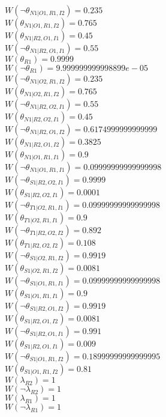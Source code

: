 $W(\neg\theta_{N1|O1,R1,I2})=0.235$\\
$W(\theta_{N1|O1,R1,I2})=0.765$\\
$W(\theta_{N1|R2,O1,I1})=0.45$\\
$W(\neg\theta_{N1|R2,O1,I1})=0.55$\\
$W(\theta_{R1})=0.9999$\\
$W(\neg\theta_{R1})=9.999999999998899e-05$\\
$W(\neg\theta_{N1|O2,R1,I2})=0.235$\\
$W(\theta_{N1|O2,R1,I2})=0.765$\\
$W(\neg\theta_{N1|R2,O2,I1})=0.55$\\
$W(\theta_{N1|R2,O2,I1})=0.45$\\
$W(\neg\theta_{N1|R2,O1,I2})=0.6174999999999999$\\
$W(\theta_{N1|R2,O1,I2})=0.3825$\\
$W(\theta_{N1|O1,R1,I1})=0.9$\\
$W(\neg\theta_{N1|O1,R1,I1})=0.09999999999999998$\\
$W(\neg\theta_{S1|R2,O2,I1})=0.9999$\\
$W(\theta_{S1|R2,O2,I1})=0.0001$\\
$W(\neg\theta_{T1|O2,R1,I1})=0.09999999999999998$\\
$W(\theta_{T1|O2,R1,I1})=0.9$\\
$W(\neg\theta_{T1|R2,O2,I2})=0.892$\\
$W(\theta_{T1|R2,O2,I2})=0.108$\\
$W(\neg\theta_{S1|O2,R1,I2})=0.9919$\\
$W(\theta_{S1|O2,R1,I2})=0.0081$\\
$W(\neg\theta_{S1|O1,R1,I1})=0.09999999999999998$\\
$W(\theta_{S1|O1,R1,I1})=0.9$\\
$W(\neg\theta_{S1|R2,O1,I2})=0.9919$\\
$W(\theta_{S1|R2,O1,I2})=0.0081$\\
$W(\neg\theta_{S1|R2,O1,I1})=0.991$\\
$W(\theta_{S1|R2,O1,I1})=0.009$\\
$W(\neg\theta_{S1|O1,R1,I2})=0.18999999999999995$\\
$W(\theta_{S1|O1,R1,I2})=0.81$\\
$W(\lambda_{R2})=1$\\
$W(\neg\lambda_{R2})=1$\\
$W(\lambda_{R1})=1$\\
$W(\neg\lambda_{R1})=1$\\
